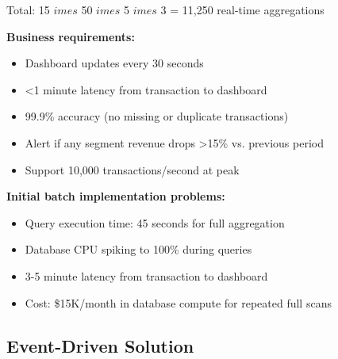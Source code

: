 Total: 15 $	imes$ 50 $	imes$ 5 $	imes$ 3 = 11,250 real-time aggregations

\textbf{Business requirements:}
\begin{itemize}
    \item Dashboard updates every 30 seconds
    \item <1 minute latency from transaction to dashboard
    \item 99.9\% accuracy (no missing or duplicate transactions)
    \item Alert if any segment revenue drops >15\% vs. previous period
    \item Support 10,000 transactions/second at peak
\end{itemize}

\textbf{Initial batch implementation problems:}
\begin{itemize}
    \item Query execution time: 45 seconds for full aggregation
    \item Database CPU spiking to 100\% during queries
    \item 3-5 minute latency from transaction to dashboard
    \item Cost: \$15K/month in database compute for repeated full scans
\end{itemize}

\subsection{Event-Driven Solution}


